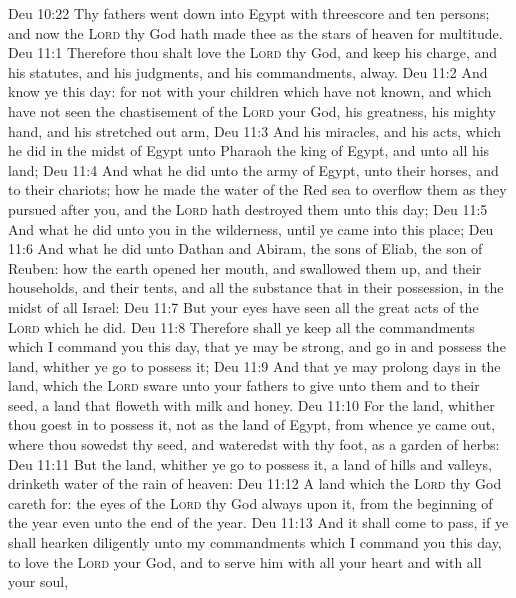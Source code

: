 \vs Deu 10:22 Thy fathers went down into Egypt with threescore and ten persons; and now the \textsc{Lord} thy God hath made thee as the stars of heaven for multitude.
\vs Deu 11:1 Therefore thou shalt love the \textsc{Lord} thy God, and keep his charge, and his statutes, and his judgments, and his commandments, alway.
\vs Deu 11:2 And know ye this day: for  not with your children which have not known, and which have not seen the chastisement of the \textsc{Lord} your God, his greatness, his mighty hand, and his stretched out arm,
\vs Deu 11:3 And his miracles, and his acts, which he did in the midst of Egypt unto Pharaoh the king of Egypt, and unto all his land;
\vs Deu 11:4 And what he did unto the army of Egypt, unto their horses, and to their chariots; how he made the water of the Red sea to overflow them as they pursued after you, and  the \textsc{Lord} hath destroyed them unto this day;
\vs Deu 11:5 And what he did unto you in the wilderness, until ye came into this place;
\vs Deu 11:6 And what he did unto Dathan and Abiram, the sons of Eliab, the son of Reuben: how the earth opened her mouth, and swallowed them up, and their households, and their tents, and all the substance that  in their possession, in the midst of all Israel:
\vs Deu 11:7 But your eyes have seen all the great acts of the \textsc{Lord} which he did.
\vs Deu 11:8 Therefore shall ye keep all the commandments which I command you this day, that ye may be strong, and go in and possess the land, whither ye go to possess it;
\vs Deu 11:9 And that ye may prolong  days in the land, which the \textsc{Lord} sware unto your fathers to give unto them and to their seed, a land that floweth with milk and honey.
\vs Deu 11:10 For the land, whither thou goest in to possess it,  not as the land of Egypt, from whence ye came out, where thou sowedst thy seed, and wateredst  with thy foot, as a garden of herbs:
\vs Deu 11:11 But the land, whither ye go to possess it,  a land of hills and valleys,  drinketh water of the rain of heaven:
\vs Deu 11:12 A land which the \textsc{Lord} thy God careth for: the eyes of the \textsc{Lord} thy God  always upon it, from the beginning of the year even unto the end of the year.
\vs Deu 11:13 And it shall come to pass, if ye shall hearken diligently unto my commandments which I command you this day, to love the \textsc{Lord} your God, and to serve him with all your heart and with all your soul,
